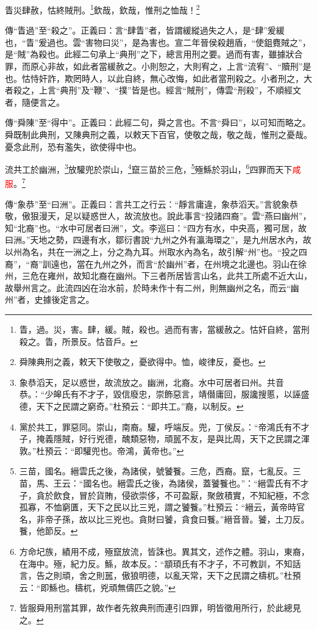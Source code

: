 眚災肆赦，怙終賊刑。\footnote{眚，過。災，害。肆，緩。賊，殺也。過而有害，當緩赦之。怙奸自終，當刑殺之。眚，所景反。怙音戶。}欽哉，欽哉，惟刑之恤哉！\footnote{舜陳典刑之義，敕天下使敬之，憂欲得中。恤，峻律反，憂也。}

{\noindent\zhuan{}\fzbyks 傳“眚過”至“殺之”。正義曰：言“肆眚”者，皆謂緩縱過失之人，是“肆”爰緩也，“眚”爰過也。雲“害物曰災”，是為害也。宣二年晉侯殺趙盾，“使鉏麑賊之”，是“賊”為殺也。此經二句承上“典刑”之下，總言用刑之要。過而有害，雖據狀合罪，而原心非故，如此者當緩赦之。小則恕之，大則宥之，上言“流宥”、“贖刑”是也。怙恃奸詐，欺罔時人，以此自終，無心改悔，如此者當刑殺之。小者刑之，大者殺之，上言“典刑”及“鞭”、“撲”皆是也。經言“賊刑”，傳雲“刑殺”，不順經文者，隨便言之。 \par}

{\noindent\zhuan{}\fzbyks 傳“舜陳”至“得中”。正義曰：此經二句，舜之言也。不言“舜曰”，以可知而略之。舜既制此典刑，又陳典刑之義，以敕天下百官，使敬之哉，敬之哉，惟刑之憂哉。憂念此刑，恐有濫失，欲使得中也。 \par}

流共工於幽洲，\footnote{象恭滔天，足以惑世，故流放之。幽洲，北裔。水中可居者曰州。共音恭。：“少皞氏有不才子，毀信廢忠，崇飾惡言，靖僣庸回，服讒搜慝，以誣盛德，天下之民謂之窮奇。”杜預云：“即共工。”裔，以制反。}放驩兜於崇山，\footnote{黨於共工，罪惡同。崇山，南裔。驩，呼端反。兜，丁侯反。：“帝鴻氏有不才子，掩義隱賊，好行兇德，醜類惡物，頑嚚不友，是與比周，天下之民謂之渾敦。”杜預云：“即驩兜也。帝鴻，黃帝也。”}竄三苗於三危，\footnote{三苗，國名。縉雲氏之後，為諸侯，號饕餮。三危，西裔。竄，七亂反。三苗，馬、王云：“國名也。縉雲氏之後，為諸侯，蓋饕餮也。”：“縉雲氏有不才子，貪於飲食，冒於貨賄，侵欲崇侈，不可盈厭，聚斂積實，不知紀極，不念孤寡，不恤窮匱，天下之民以比三兇，謂之饕餮。”杜預云：“縉云，黃帝時官名，非帝子孫，故以比三兇也。貪財曰饕，貪食曰餮。”縉音晉。饕，土刀反。餮，他節反。}殛鯀於羽山，\footnote{方命圮族，績用不成，殛竄放流，皆誅也。異其文，述作之體。羽山，東裔，在海中。殛，紀力反。鯀，故本反。：“顓頊氏有不才子，不可教訓，不知話言，告之則頑，舍之則嚚，傲狼明德，以亂天常，天下之民謂之檮杌。”杜預云：“即鯀也。檮杌，兇頑無儔匹之貌。”}四罪而天下\textcolor{red}{咸服}。\footnote{皆服舜用刑當其罪，故作者先敘典刑而連引四罪，明皆徵用所行，於此總見之。}

{\noindent\zhuan{}\fzbyks 傳“象恭”至“曰洲”。正義曰：言共工之行云：“靜言庸違，象恭滔天。”言貌象恭敬，傲狠漫天，足以疑惑世人，故流放也。說此事言“投諸四裔”。雲“燕曰幽州”，知“北裔”也。“水中可居者曰洲”，文。李巡曰：“四方有水，中央高，獨可居，故曰洲。”天地之勢，四邊有水，鄒衍書說“九州之外有瀛海環之”，是九州居水內，故以州為名，共在一洲之上，分之為九耳。州取水內為名，故引解“州”也。“投之四裔”，“裔”訓遠也，當在九州之外，而言“於幽州”者，在州境之北邊也。羽山在徐州，三危在雍州，故知北裔在幽州。下三者所居皆言山名，此共工所處不近大山，故舉州言之。此流四凶在治水前，於時未作十有二州，則無幽州之名，而云“幽州”者，史據後定言之。 \par}

